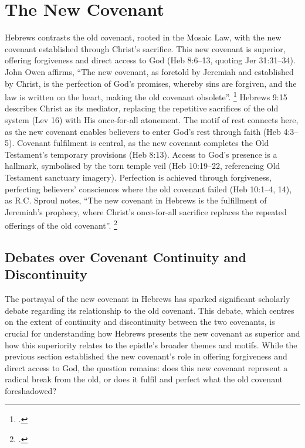 \documentclass[12pt]{article}
\def\christ{the Messiah}
\def\christ{Christ}
\begin{document}
\section{The New Covenant}
Hebrews contrasts the old covenant, rooted in the Mosaic Law, with the new
covenant established through \christ{}’s sacrifice. This new covenant is
superior, offering forgiveness and direct access to God (Heb 8:6--13, quoting
Jer 31:31--34). John Owen affirms, ``The new covenant, as foretold by Jeremiah
and established by \christ{}, is the perfection of God’s promises, whereby sins
are forgiven, and the law is written on the heart, making the old covenant
obsolete''. \footcite[4:123]{Owen1854}
%
Hebrews 9:15 describes \christ{} as its mediator,
replacing the repetitive sacrifices of the old system (Lev 16) with His
once-for-all atonement. The motif of rest connects here, as the new covenant
enables believers to enter God’s rest through faith (Heb 4:3--5). Covenant
fulfilment is central, as the new covenant completes the Old Testament’s
temporary provisions (Heb 8:13). Access to God’s presence is a hallmark,
symbolised by the torn temple veil (Heb 10:19--22, referencing Old Testament
sanctuary imagery).
%
Perfection is achieved through forgiveness, perfecting believers’ consciences
where the old covenant failed (Heb 10:1--4, 14), as R.C.  Sproul notes, ``The
new covenant in Hebrews is the fulfillment of Jeremiah’s prophecy, where
Christ’s once-for-all sacrifice replaces the repeated offerings of the old
covenant''. \footcite[45]{Sproul1985}

\subsection{Debates over Covenant Continuity and Discontinuity}
The portrayal of the new covenant in Hebrews has sparked significant scholarly
debate regarding its relationship to the old covenant. This debate, which
centres on the extent of continuity and discontinuity between the two covenants,
is crucial for understanding how Hebrews presents the new covenant as superior
and how this superiority relates to the epistle’s broader themes and motifs.
While the previous section established the new covenant’s role in offering
forgiveness and direct access to God, the question remains: does this new
covenant represent a radical break from the old, or does it fulfil and perfect
what the old covenant foreshadowed?
\end{document}
